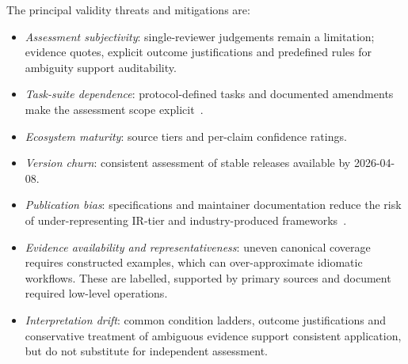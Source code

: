 The principal validity threats and mitigations are:
\begin{itemize}
    \item \textit{Assessment subjectivity}: single-reviewer judgements remain a limitation; evidence quotes, explicit outcome justifications and predefined rules for ambiguity support auditability.
    \item \textit{Task-suite dependence}: protocol-defined tasks and documented amendments make the assessment scope explicit~\cite{kavadias2026qplSurveyProtocol}.
    \item \textit{Ecosystem maturity}: source tiers and per-claim confidence ratings.
    \item \textit{Version churn}: consistent assessment of stable releases available by 2026-04-08.
    \item \textit{Publication bias}: specifications and maintainer documentation reduce the risk of under-representing IR-tier and industry-produced frameworks~\cite{KitchenhamCharters2007SLR,page2021prisma}.
    \item \textit{Evidence availability and representativeness}: uneven canonical coverage requires constructed examples, which can over-approximate idiomatic workflows.
    These are labelled, supported by primary sources and document required low-level operations.
    \item \textit{Interpretation drift}: common condition ladders, outcome justifications and conservative treatment of ambiguous evidence support consistent application, but do not substitute for independent assessment.
\end{itemize}
